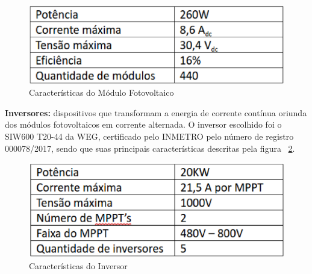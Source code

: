 \begin{figure}[!ht]
  \centering
  \includegraphics[keepaspectratio=true,scale=0.6]{figuras/caracteristicas_fotovoltaico.eps}
  \caption{Características do Módulo Fotovoltaico}
  \label{fig:caracteristica_fotovoltaico_1}
\end{figure}

\textbf{Inversores:} dispositivos que transformam a energia de corrente contínua oriunda dos módulos fotovoltaicos em corrente alternada. O inversor escolhido foi o SIW600 T20-44 da WEG, certificado pelo INMETRO pelo número de registro 000078/2017, sendo que suas principais características descritas pela figura ~\ref{fig:caracteristica_fotovoltaico_2}.

\begin{figure}[!ht]
  \centering
  \includegraphics[keepaspectratio=true,scale=0.6]{figuras/SmartGrid_Caracteristicas_fotovotaico_2.eps}
  \caption{Características do Inversor}
  \label{fig:caracteristica_fotovoltaico_2}
\end{figure}

